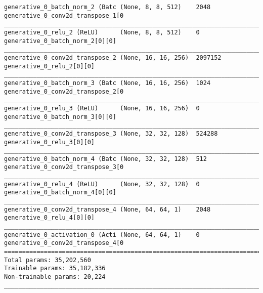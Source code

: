 \begin{lstlisting}[caption={\textsc{Mnist}-\ac{VLAE}-\ac{GAN} Decoder},captionpos=b,basicstyle=\tiny, label={lst:mnist-vlae-gan-decoder}]
generative_0_batch_norm_2 (Batc (None, 8, 8, 512)    2048        generative_0_conv2d_transpose_1[0
__________________________________________________________________________________________________
generative_0_relu_2 (ReLU)      (None, 8, 8, 512)    0           generative_0_batch_norm_2[0][0]
__________________________________________________________________________________________________
generative_0_conv2d_transpose_2 (None, 16, 16, 256)  2097152     generative_0_relu_2[0][0]
__________________________________________________________________________________________________
generative_0_batch_norm_3 (Batc (None, 16, 16, 256)  1024        generative_0_conv2d_transpose_2[0
__________________________________________________________________________________________________
generative_0_relu_3 (ReLU)      (None, 16, 16, 256)  0           generative_0_batch_norm_3[0][0]
__________________________________________________________________________________________________
generative_0_conv2d_transpose_3 (None, 32, 32, 128)  524288      generative_0_relu_3[0][0]
__________________________________________________________________________________________________
generative_0_batch_norm_4 (Batc (None, 32, 32, 128)  512         generative_0_conv2d_transpose_3[0
__________________________________________________________________________________________________
generative_0_relu_4 (ReLU)      (None, 32, 32, 128)  0           generative_0_batch_norm_4[0][0]
__________________________________________________________________________________________________
generative_0_conv2d_transpose_4 (None, 64, 64, 1)    2048        generative_0_relu_4[0][0]
__________________________________________________________________________________________________
generative_0_activation_0 (Acti (None, 64, 64, 1)    0           generative_0_conv2d_transpose_4[0
==================================================================================================
Total params: 35,202,560
Trainable params: 35,182,336
Non-trainable params: 20,224
__________________________________________________________________________________________________
\end{lstlisting}